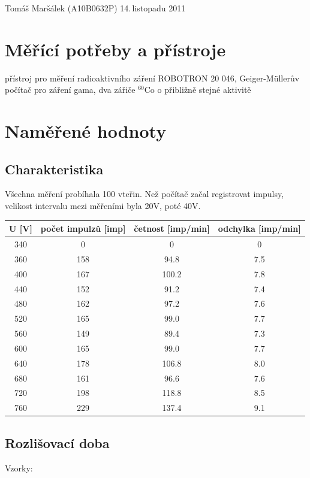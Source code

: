 \documentclass[11pt]{article}
\begin{document}
 {Tomáš Maršálek}
 {(A10B0632P)}
 {14.\,listopadu 2011}

\section{Měřící potřeby a přístroje}
přístroj pro měření radioaktivního záření ROBOTRON 20 046, Geiger-M\"ullerův
počítač pro záření gama, dva zářiče $^{60}$Co o přibližně stejné aktivitě

\section{Naměřené hodnoty}
\subsection{Charakteristika}
Všechna měření probíhala 100 vteřin. Než počítač začal registrovat impulsy,
velikost intervalu mezi měřeními byla 20V, poté 40V. \\

\begin{center}
\begin{tabular}{|c|c|c|c|}
\hline
U [V] & počet impulzů [imp] & četnost [imp/min] & odchylka [imp/min]\\
\hline
340 & 0   & 0      & 0 \\
360 & 158 & 94.8   & 7.5  \\
400 & 167 & 100.2  & 7.8  \\
440 & 152 & 91.2   & 7.4  \\
480 & 162 & 97.2   & 7.6  \\
520 & 165 & 99.0   & 7.7  \\
560 & 149 & 89.4   & 7.3  \\
600 & 165 & 99.0   & 7.7  \\
640 & 178 & 106.8  & 8.0  \\
680 & 161 & 96.6   & 7.6  \\
720 & 198 & 118.8  & 8.5  \\
760 & 229 & 137.4  & 9.1  \\
\hline
\end{tabular}
\end{center}

\vspace{.5cm}
\subsection{Rozlišovací doba}
Vzorky: \\
\end{document}
